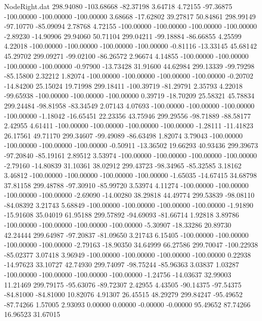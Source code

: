 \begin{filecontents}{NodeRight.dat}
 298.94080 -103.68668  -82.37198     3.64718    4.72155  -97.36875 -100.00000 -100.00000 -100.00000    3.68668  -17.62802   39.27817   50.84861
 298.99149  -97.10770  -85.09094     2.78768    4.72155 -100.00000 -100.00000 -100.00000 -100.00000   -2.89230  -14.90906   29.94060   50.71104
 299.04211  -99.18884  -86.66855     4.25599    4.22018 -100.00000 -100.00000 -100.00000 -100.00000   -0.81116  -13.33145   45.68142   45.29702
 299.09271  -99.02100  -86.26572     2.96674    4.14855 -100.00000 -100.00000 -100.00000 -100.00000   -0.97900  -13.73428   31.91600   44.62984
 299.13339  -99.79298  -85.15800     2.32212    1.82074 -100.00000 -100.00000 -100.00000 -100.00000   -0.20702  -14.84200   25.15024   19.71998
 299.18411 -100.39719  -81.29791     2.35793    4.22018  -99.65938 -100.00000 -100.00000 -100.00000    0.39719  -18.70209   25.58321   45.78834
 299.24484  -98.81958  -83.34549     2.07143    4.07693 -100.00000 -100.00000 -100.00000 -100.00000   -1.18042  -16.65451   22.23356   43.75946
 299.29556  -98.71889  -88.58177     2.42955    4.61411 -100.00000 -100.00000 -100.00000 -100.00000   -1.28111  -11.41823   26.17561   49.71170
 299.34607  -99.49089  -86.63498     1.82074    3.79043 -100.00000 -100.00000 -100.00000 -100.00000   -0.50911  -13.36502   19.66293   40.93436
 299.39673  -97.20840  -85.19161     2.89512    3.53974 -100.00000 -100.00000 -100.00000 -100.00000   -2.79160  -14.80839   31.10361   38.02912
 299.43723  -98.34965  -85.32585     3.18162    3.46812 -100.00000 -100.00000 -100.00000 -100.00000   -1.65035  -14.67415   34.68798   37.81158
 299.48788  -97.30910  -85.99720     3.53974    4.11274 -100.00000 -100.00000 -100.00000 -100.00000   -2.69090  -14.00280   38.29818   44.49774
 299.53839  -98.08110  -84.08392     3.21743    5.68849 -100.00000 -100.00000 -100.00000 -100.00000   -1.91890  -15.91608   35.04019   61.95188
 299.57892  -94.69093  -81.66714     1.92818    3.89786 -100.00000 -100.00000 -100.00000 -100.00000   -5.30907  -18.33286   20.89730   42.24444
 299.64987  -97.20837  -81.09650     3.21743    6.15405 -100.00000 -100.00000 -100.00000 -100.00000   -2.79163  -18.90350   34.64999   66.27586
 299.70047 -100.22938  -85.02377     3.07418    3.96949 -100.00000 -100.00000 -100.00000 -100.00000    0.22938  -14.97623   33.10727   42.74930
 299.74097  -98.75244  -85.96363     3.03837    1.03287 -100.00000 -100.00000 -100.00000 -100.00000   -1.24756  -14.03637   32.99003   11.21469
 299.79175  -95.63076  -89.72307     2.42955    4.43505  -90.14375  -97.54375  -84.81000  -84.81000   10.82076    4.91307   26.45515   48.29279
 299.84247  -95.49652  -87.74266     1.57005    2.93093    0.00000    0.00000   -0.00000   -0.00000   95.49652   87.74266   16.96523   31.67015

\end{filecontents}
